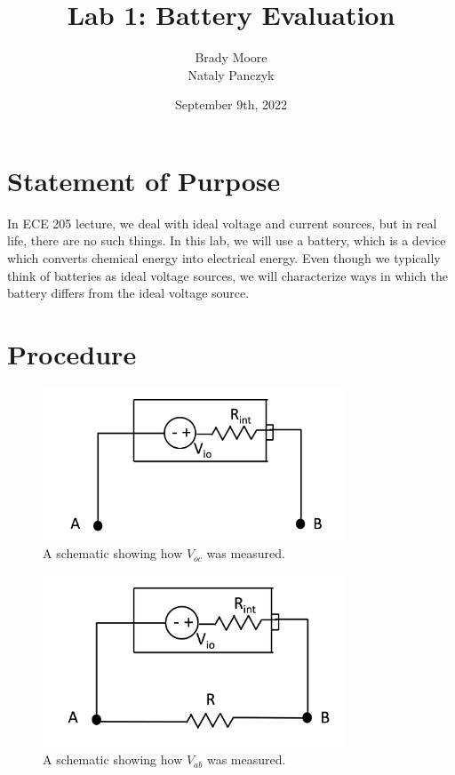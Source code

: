 \documentclass{report}
\title{Lab 1: Battery Evaluation}
\date{September 9th, 2022}
\author{Brady Moore \\
    Nataly Panczyk}
\begin{document}
\maketitle
\section{Statement of Purpose}
In ECE 205 lecture, we deal with ideal voltage and current sources, but in real life, there are no such things.
In this lab, we will use a battery, which is a device which converts chemical energy into electrical energy.
Even though we typically think of batteries as ideal voltage sources, we will characterize ways in which the battery differs from the ideal voltage source.

\section{Procedure}
\begin{figure}[htpb]
    \centering
    \includegraphics[width=0.8\textwidth]{SchematicA.png}
    \caption{A schematic showing how $V_{oc}$ was measured.}
    \label{fig:SchemA}
\end{figure}
\begin{figure}[htpb]
    \centering
    \includegraphics[width=0.8\textwidth]{SchematicB.png}
    \caption{A schematic showing how $V_{ab}$ was measured.}
    \label{fig:SchemB}
\end{figure}
\end{document}

